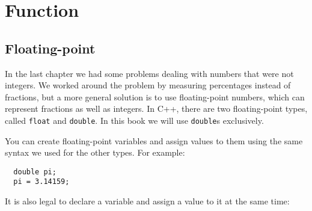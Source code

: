 





\chapter{Function}

\section{Floating-point}

In the last chapter we had some problems dealing with numbers
that were not integers.  We worked around the problem by measuring
percentages instead of fractions, but a more general solution is
to use floating-point numbers, which can represent fractions
as well as integers.  In C++, there are two floating-point types,
called {\tt float} and {\tt double}.  In this book we will use
{\tt double}s exclusively.

You can create floating-point variables and assign values to them
using the same syntax we used for the other types.  For example:

\begin{lstlisting}
  double pi;
  pi = 3.14159;
\end{lstlisting}
%
It is also legal to declare a variable and assign a value to it at the
same time:

